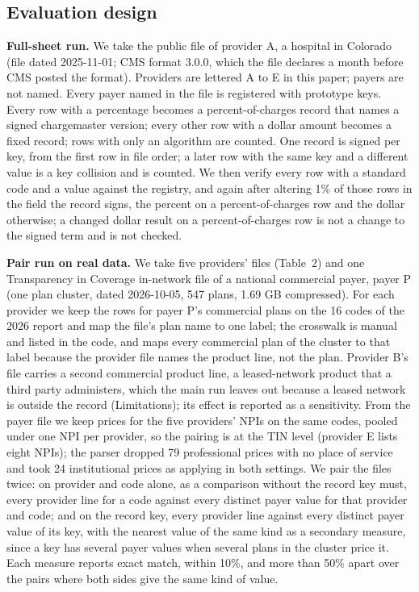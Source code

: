 \documentclass[10pt]{article}
\begin{document}
\subsection*{Evaluation design}

\textbf{Full-sheet run.} We take the public file of provider A, a hospital in Colorado (file dated 2025-11-01; CMS format 3.0.0, which the file declares a month before CMS posted the format). Providers are lettered A to E in this paper; payers are not named. Every payer named in the file is registered with prototype keys. Every row with a percentage becomes a percent-of-charges record that names a signed chargemaster version; every other row with a dollar amount becomes a fixed record; rows with only an algorithm are counted. One record is signed per key, from the first row in file order; a later row with the same key and a different value is a key collision and is counted. We then verify every row with a standard code and a value against the registry, and again after altering 1\% of those rows in the field the record signs, the percent on a percent-of-charges row and the dollar otherwise; a changed dollar result on a percent-of-charges row is not a change to the signed term and is not checked.

\textbf{Pair run on real data.} We take five providers' files (Table~2) and one Transparency in Coverage in-network file of a national commercial payer, payer P (one plan cluster, dated 2026-10-05, 547 plans, 1.69 GB compressed). For each provider we keep the rows for payer P's commercial plans on the 16 codes of the 2026 report and map the file's plan name to one label; the crosswalk is manual and listed in the code, and maps every commercial plan of the cluster to that label because the provider file names the product line, not the plan. Provider B's file carries a second commercial product line, a leased-network product that a third party administers, which the main run leaves out because a leased network is outside the record (Limitations); its effect is reported as a sensitivity. From the payer file we keep prices for the five providers' NPIs on the same codes, pooled under one NPI per provider, so the pairing is at the TIN level (provider E lists eight NPIs); the parser dropped 79 professional prices with no place of service and took 24 institutional prices as applying in both settings. We pair the files twice: on provider and code alone, as a comparison without the record key must, every provider line for a code against every distinct payer value for that provider and code; and on the record key, every provider line against every distinct payer value of its key, with the nearest value of the same kind as a secondary measure, since a key has several payer values when several plans in the cluster price it. Each measure reports exact match, within 10\%, and more than 50\% apart over the pairs where both sides give the same kind of value.
\end{document}
